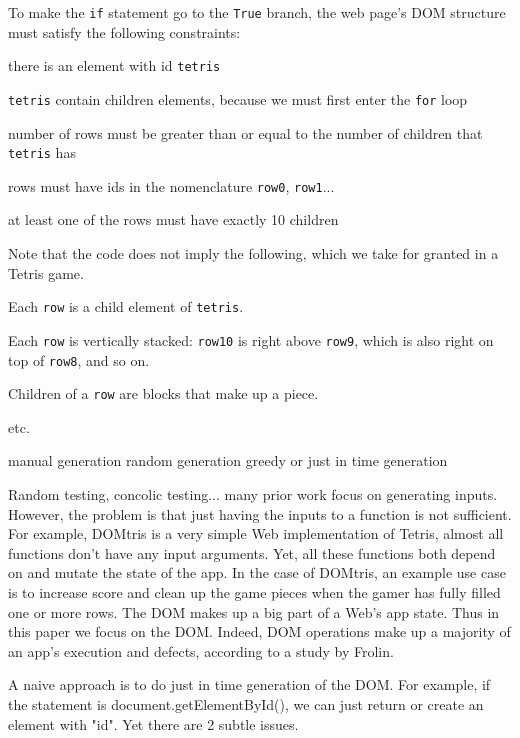 To make the {\tt if} statement go to the {\tt True} branch, the web page's DOM structure must satisfy the following constraints:
\begin {compactitem}
\item there is an element with id {\tt tetris}
\item {\tt tetris} contain children elements, because we must first enter the {\tt for} loop
\item number of rows must be greater than or equal to the number of children that {\tt tetris} has
\item rows must have ids in the nomenclature {\tt row0}, {\tt row1}...
\item at least one of the rows must have exactly 10 children
\end {compactitem}

Note that the code does not imply the following, which we take for granted in a Tetris game.
\begin {compactitem}
\item Each {\tt row} is a child element of {\tt tetris}.
\item Each {\tt row} is vertically stacked: {\tt row10} is right above {\tt row9}, which is also right on top of {\tt row8}, and so on.
\item Children of a {\tt row} are blocks that make up a piece.  
\item etc.
\end {compactitem}

manual generation
random generation
greedy or just in time generation ~\cite{ZenCoding}



Random testing, concolic testing... many prior work focus on generating inputs. 
However, the problem is that just having the inputs to a function is not sufficient.  
For example, DOMtris is a very simple Web implementation of Tetris, almost all functions don't have any input arguments.  
Yet, all these functions both depend on and mutate the state of the app.  
In the case of DOMtris, an example use case is to increase score and clean up the game pieces when the gamer has fully filled one or more rows.  
The DOM makes up a big part of a Web's app state.  
Thus in this paper we focus on the DOM.  
Indeed, DOM operations make up a majority of an app's execution and defects, according to a study by Frolin.  

A naive approach is to do just in time generation of the DOM.  
For example, if the statement is document.getElementById(), we can just return or create an element with "id".  
Yet there are 2 subtle issues.

